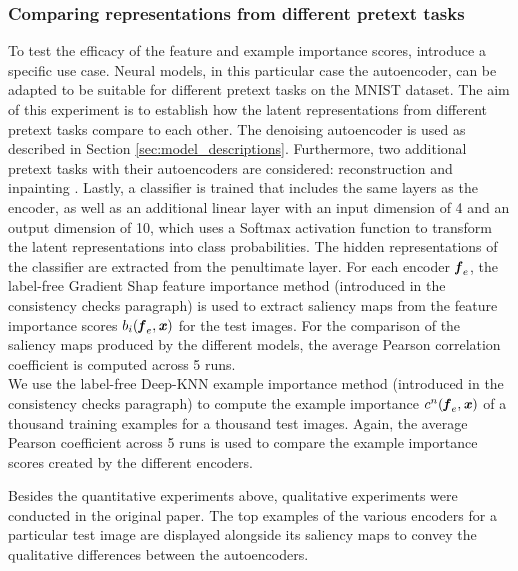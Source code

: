 \subsubsection{Comparing representations from different pretext tasks}
To test the efficacy of the feature and example importance scores, \citeauthor{LabelFreeExplainability} introduce a specific use case. Neural models, in this particular case the autoencoder, can be adapted to be suitable for different pretext tasks on the MNIST dataset. The aim of this experiment is to establish how the latent representations from different pretext tasks compare to each other. The denoising autoencoder is used as described in Section \ref{sec:model_descriptions}. Furthermore, two additional pretext tasks with their autoencoders are considered: reconstruction and inpainting \cite{pandit2020inference}. Lastly, a classifier is trained that includes the same layers as the encoder, as well as an additional linear layer with an input dimension of 4 and an output dimension of 10, which uses a Softmax activation function to transform the latent representations into class probabilities. The hidden representations of the classifier are extracted from the penultimate layer. %
For each encoder $\textbf{\textit{f}}_e$, the label-free Gradient Shap feature importance method (introduced in the consistency checks paragraph) is used to extract saliency maps from the feature importance scores $b_i(\textbf{\textit{f}}_e, \textbf{\textit{x}})$ for the test images. For the comparison of the saliency maps produced by the different models, the average Pearson correlation coefficient \cite{le2013methods} is computed across 5 runs.\\
We use the label-free Deep-KNN example importance method (introduced in the consistency checks paragraph) to compute the example importance $c^n(\textbf{\textit{f}}_e,\textbf{\textit{x}})$ of a thousand training examples for a thousand test images. Again, the average Pearson coefficient across 5 runs is used to compare the example importance scores created by the different encoders.

Besides the quantitative experiments above, qualitative experiments were conducted in the original paper. The top examples of the various encoders for a particular test image are displayed alongside its saliency maps to convey the qualitative differences between the autoencoders. %

